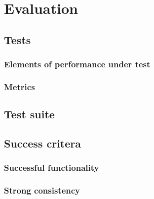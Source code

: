 \chapter{Evaluation}

\section{Tests}

\subsection{Elements of performance under test}

\subsection{Metrics}

\section{Test suite}

\section{Success critera}

\subsection{Successful functionality}

\subsection{Strong consistency}
